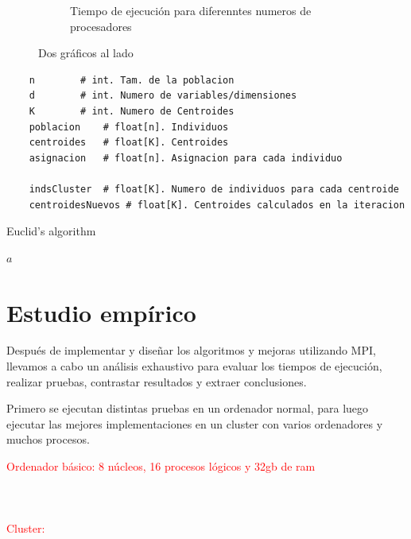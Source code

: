 \begin{figure}
\begin{subfigure}[b]{0.45\textwidth}
		\caption{Tiempo de ejecución para diferenntes numeros de procesadores}
		\label{fig:execution_time}
	\end{subfigure}
	
	
	\caption{Dos gráficos al lado}
	\label{fig:twoplots}
\end{figure}


\newpage

\begin{verbatim}
	n		 # int. Tam. de la poblacion
	d		 # int. Numero de variables/dimensiones
	K		 # int. Numero de Centroides
	poblacion	 # float[n]. Individuos 
	centroides	 # float[K]. Centroides
	asignacion	 # float[n]. Asignacion para cada individuo
	
	indsCluster	 # float[K]. Numero de individuos para cada centroide
	centroidesNuevos # float[K]. Centroides calculados en la iteracion
\end{verbatim}

\begin{algorithm}
	\caption{Euclid's algorithm}
	\Return $a$\;
\end{algorithm}

\newpage

\chapter{Estudio empírico}

Después de implementar y diseñar los algoritmos y mejoras utilizando MPI, llevamos a  cabo un análisis exhaustivo para evaluar los tiempos de ejecución, realizar pruebas, contrastar resultados y extraer conclusiones.

Primero se ejecutan distintas pruebas en un ordenador normal, para luego ejecutar las mejores implementaciones en un cluster con varios ordenadores y muchos procesos.



\begin{tcolorbox}[boxrule=0.5pt, fontupper=\small]
\scriptsize
\textcolor{red}{
Ordenador básico: 8 núcleos, 16 procesos lógicos y 32gb de ram\\
\\
\\
\\
Cluster:
\\
}
\end{tcolorbox}
	



